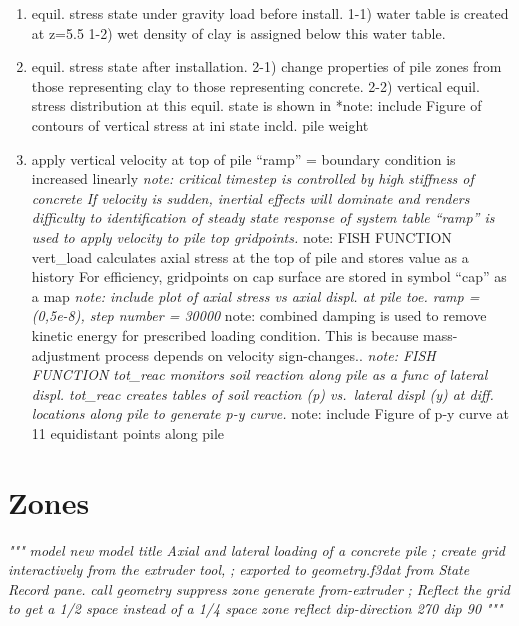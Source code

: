\documentclass[a4paper, nobind]{templates/ociamthesis}
\providecommand{\tightlist}{%
  \setlength{\itemsep}{0pt}\setlength{\parskip}{0pt}}
\newenvironment{Shaded}{\begin{snugshade}}{\end{snugshade}}
\newcommand{\CommentTok}[1]{\textcolor[rgb]{0.56,0.35,0.01}{\textit{#1}}}
\renewenvironment{Shaded}
{
  \vspace{10pt}%
  \begin{snugshade}%
}{%
  \end{snugshade}%
  \vspace{8pt}%
}
\begin{document}
\begin{enumerate}
\def\labelenumi{\arabic{enumi})}
\tightlist
\item
  equil. stress state under gravity load before install.
  1-1) water table is created at z=5.5
  1-2) wet density of clay is assigned below this water table.
\item
  equil. stress state after installation.
  2-1) change properties of pile zones from those
  representing clay to those representing concrete.
  2-2) vertical equil. stress distribution at this equil. state is shown in
  *note: include Figure of contours of vertical stress at ini state incld. pile weight
\item
  apply vertical velocity at top of pile
  ``ramp'' = boundary condition is increased linearly
  \emph{note: critical timestep is controlled by high stiffness of concrete
  If velocity is sudden, inertial effects will dominate and renders difficulty to identification of steady state response of system
  table ``ramp'' is used to apply velocity to pile top gridpoints.
  }note: FISH FUNCTION vert\_load calculates axial stress at the top of pile and stores value as a history
  For efficiency, gridpoints on cap surface are stored in symbol ``cap'' as a map
  \emph{note: include plot of axial stress vs axial displ. at pile toe. ramp = (0,5e-8), step number = 30000
  }note: combined damping is used to remove kinetic energy for prescribed loading condition. This is because mass-adjustment process depends on velocity sign-changes..
  \emph{note: FISH FUNCTION tot\_reac monitors soil reaction along pile as a func of lateral displ. tot\_reac creates tables of soil reaction (p) vs.~lateral displ (y) at diff. locations along pile to generate p-y curve.
  }note: include Figure of p-y curve at 11 equidistant points along pile
\end{enumerate}

\hypertarget{zones-3}{%
\section{Zones}\label{zones-3}}

\begin{Shaded}
\begin{Highlighting}[]
\CommentTok{"""}
\CommentTok{model new}
\CommentTok{model title \textquotesingle{}Axial and lateral loading of a concrete pile\textquotesingle{}}
\CommentTok{; create grid interactively from the extruder tool, }
\CommentTok{; exported to geometry.f3dat from State Record pane.}
\CommentTok{call \textquotesingle{}geometry\textquotesingle{} suppress}
\CommentTok{zone generate from{-}extruder}
\CommentTok{; Reflect the grid to get a 1/2 space instead of a 1/4 space}
\CommentTok{zone reflect dip{-}direction 270 dip 90}
\CommentTok{"""}
\end{Highlighting}
\end{Shaded}
\end{document}
